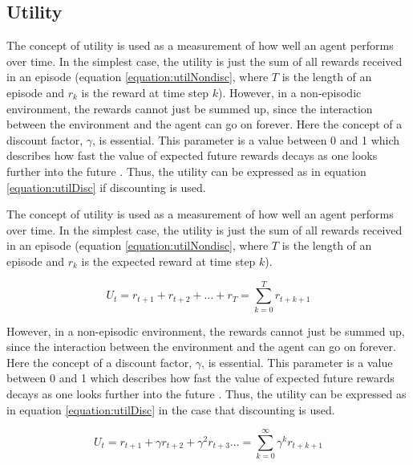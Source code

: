 \subsection{Utility}
\label{theBestLabelEvah}
\label{sec:utility}
The concept of utility is used as a measurement of how well an agent performs over time. In the simplest case, the utility is just the sum of all rewards received in an episode (equation \eqref{equation:utilNondisc}, where $T$ is the length of an episode and $r_k$ is the reward at time step $k$). However, in a non-episodic environment, the rewards cannot just be summed up, since the interaction between the environment and the agent can go on forever. Here the concept of a discount factor, $\gamma$, is essential. This parameter is a value between 0 and 1 which describes how fast the value of expected future
rewards decays as one looks further into the future
\parencite{barto1998reinforcement}. Thus, the utility can be expressed as in equation \eqref{equation:utilDisc} if discounting is used. 

The concept of utility is used as a measurement of how well an agent performs
over time. In the simplest case, the utility is just the sum of all rewards
received in an episode (equation \eqref{equation:utilNondisc}, where $T$ is the
length of an episode and $r_k$ is the expected reward at time step $k$).

\begin{equation}
\label{equation:utilNondisc}
U_t = r_{t+1} + r_{t+2} + \dots + r_{T}
  = \sum\limits_{k = 0}^{T} r_{t+k+1}
\end{equation}

However, in a non-episodic environment, the rewards cannot just be summed up,
since the interaction between the environment and the agent can go on forever.
Here the concept of a discount factor, $\gamma$, is essential. This parameter
is a value between 0 and 1 which describes how fast the value of expected
future rewards decays as one looks further into the future
\parencite{barto1998reinforcement}. Thus, the utility can be expressed as in
equation \eqref{equation:utilDisc} in the case that discounting is used. 

\begin{equation}
\label{equation:utilDisc}
U_{t} = r_{t + 1} + \gamma r_{t + 2} + \gamma^2 r_{t + 3} \dots
  =  \sum\limits_{k = 0}^\infty \gamma^kr_{t+k+1}
\end{equation}






